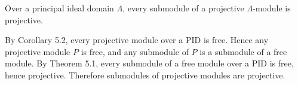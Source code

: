 Over a principal ideal domain $\Lambda$, every submodule of a projective $\Lambda$-module is projective.

By Corollary 5.2, every projective module over a PID is free. Hence any projective module $P$ is free, and any submodule of $P$ is a submodule of a free module. By Theorem 5.1, every submodule of a free module over a PID is free, hence projective. Therefore submodules of projective modules are projective.
